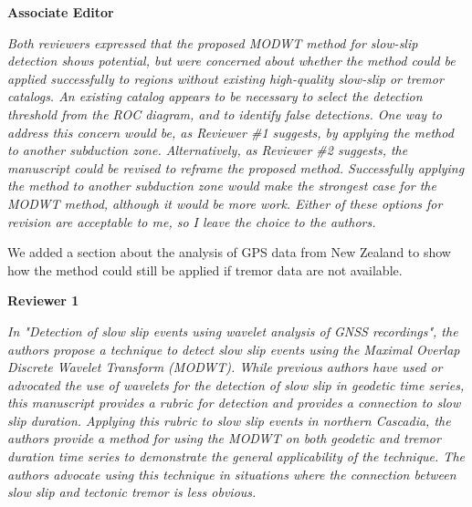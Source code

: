 \documentclass[letterpaper, 12pt]{article}
\begin{document}
\textbf{Associate Editor}

\bigskip

\textit{Both reviewers expressed that the proposed MODWT method for slow-slip detection shows potential, but were concerned about whether the method could be applied successfully to regions without existing high-quality slow-slip or tremor catalogs.  An existing catalog appears to be necessary to select the detection threshold from the ROC diagram, and to identify false detections.  One way to address this concern would be, as Reviewer \#1 suggests, by applying the method to another subduction zone.  Alternatively, as Reviewer \#2 suggests, the manuscript could be revised to reframe the proposed method.  Successfully applying the method to another subduction zone would make the strongest case for the MODWT method, although it would be more work.  Either of these options for revision are acceptable to me, so I leave the choice to the authors.}

\bigskip

We added a section about the analysis of GPS data from New Zealand to show how the method could still be applied if tremor data are not available.

\bigskip

\textbf{Reviewer 1}

\bigskip

\textit{In "Detection of slow slip events using wavelet analysis of GNSS recordings", the authors propose a technique to detect slow slip events using the Maximal Overlap Discrete Wavelet Transform (MODWT). While previous authors have used or advocated the use of wavelets for the detection of slow slip in geodetic time series, this manuscript provides a rubric for detection and provides a connection to slow slip duration. Applying this rubric to slow slip events in northern Cascadia, the authors provide a method for using the MODWT on both geodetic and tremor duration time series to demonstrate the general applicability of the technique. The authors advocate using this technique in situations where the connection between slow slip and tectonic tremor is less obvious.} \\
\end{document}
